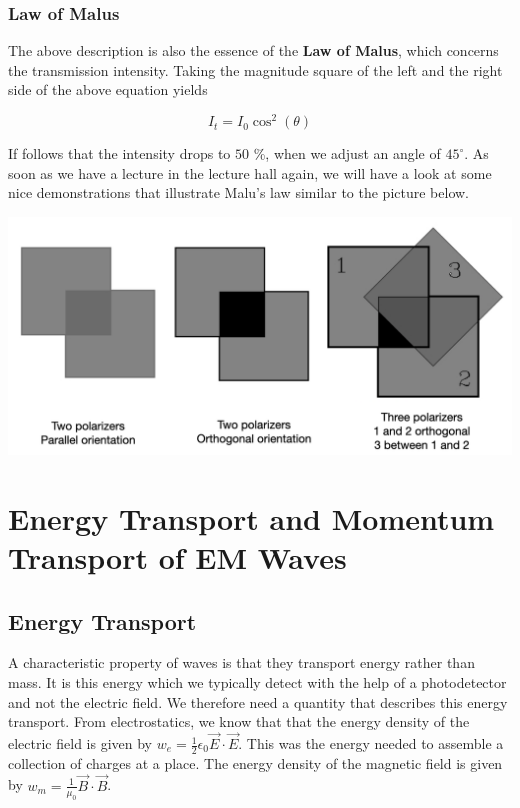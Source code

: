 \documentclass[
  a4paper,
]{book}
\begin{document}
\subsection{Law of Malus}\label{law-of-malus}

The above description is also the essence of the \textbf{Law of Malus},
which concerns the transmission intensity. Taking the magnitude square
of the left and the right side of the above equation yields

\[
I_t=I_0\cos^2(\theta)
\]

If follows that the intensity drops to \(50\) \%, when we adjust an
angle of \(45^{\circ}\). As soon as we have a lecture in the lecture
hall again, we will have a look at some nice demonstrations that
illustrate Malu's law similar to the picture below.

\includegraphics[width=0.9\linewidth,height=\textheight,keepaspectratio]{electromagnetic-waves/img/malus.png}

\chapter{Energy Transport and Momentum Transport of EM
Waves}\label{energy-transport-and-momentum-transport-of-em-waves}

\section{Energy Transport}\label{energy-transport}

A characteristic property of waves is that they transport energy rather
than mass. It is this energy which we typically detect with the help of
a photodetector and not the electric field. We therefore need a quantity
that describes this energy transport. From electrostatics, we know that
that the energy density of the electric field is given by
\(w_e=\frac{1}{2}\epsilon_0 \vec{E}\cdot\vec{E}\). This was the energy
needed to assemble a collection of charges at a place. The energy
density of the magnetic field is given by
\(w_m=\frac{1}{\mu_0}\vec{B}\cdot\vec{B}\).
\end{document}
